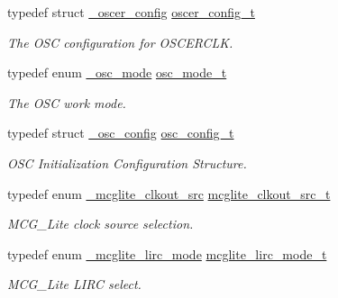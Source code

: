 \begin{DoxyCompactItemize}
\mbox{\label{group__clock_ga3280fcfc08b1b4b0989197cc56239fb6}} 
typedef struct \mbox{\hyperlink{struct__oscer__config}{\+\_\+oscer\+\_\+config}} \mbox{\hyperlink{group__clock_ga3280fcfc08b1b4b0989197cc56239fb6}{oscer\+\_\+config\+\_\+t}}
\begin{DoxyCompactList}\small\item\em The O\+SC configuration for O\+S\+C\+E\+R\+C\+LK. \end{DoxyCompactList}\item 
\mbox{\label{group__clock_ga86e25a9d93f6b00c118c7f8eda32d67b}} 
typedef enum \mbox{\hyperlink{group__clock_ga12cda0e98e38fafaa3ebc980ce32605f}{\+\_\+osc\+\_\+mode}} \mbox{\hyperlink{group__clock_ga86e25a9d93f6b00c118c7f8eda32d67b}{osc\+\_\+mode\+\_\+t}}
\begin{DoxyCompactList}\small\item\em The O\+SC work mode. \end{DoxyCompactList}\item 
typedef struct \mbox{\hyperlink{struct__osc__config}{\+\_\+osc\+\_\+config}} \mbox{\hyperlink{group__clock_ga7b42afca82c7234da7c1ccd5fc4d984b}{osc\+\_\+config\+\_\+t}}
\begin{DoxyCompactList}\small\item\em O\+SC Initialization Configuration Structure. \end{DoxyCompactList}\item 
\mbox{\label{group__clock_ga102f26486150540dc286f6811c71d8ec}} 
typedef enum \mbox{\hyperlink{group__clock_ga368b350a921470dc046d2403ea2fedf3}{\+\_\+mcglite\+\_\+clkout\+\_\+src}} \mbox{\hyperlink{group__clock_ga102f26486150540dc286f6811c71d8ec}{mcglite\+\_\+clkout\+\_\+src\+\_\+t}}
\begin{DoxyCompactList}\small\item\em M\+C\+G\+\_\+\+Lite clock source selection. \end{DoxyCompactList}\item 
\mbox{\label{group__clock_gae34f40906c4c49aa0a4fdfb00b1cc260}} 
typedef enum \mbox{\hyperlink{group__clock_gab91799aa690e0aca9897dbc4887c3945}{\+\_\+mcglite\+\_\+lirc\+\_\+mode}} \mbox{\hyperlink{group__clock_gae34f40906c4c49aa0a4fdfb00b1cc260}{mcglite\+\_\+lirc\+\_\+mode\+\_\+t}}
\begin{DoxyCompactList}\small\item\em M\+C\+G\+\_\+\+Lite L\+I\+RC select. \end{DoxyCompactList}\item 

\end{DoxyCompactItemize}
